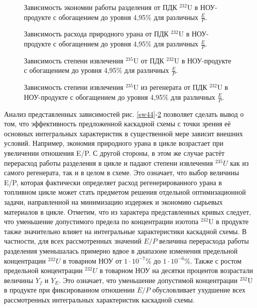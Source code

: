 \begin{figure}[ht]
    \centering
    \begin{minipage}{.5\textwidth}
      \centering
      
\caption{{Зависимость экономии работы разделения от ПДК $^{232}$U в НОУ-продукте с обогащением до уровня 4,95\% для различных $\frac{E}{P}$.{\label{sw495}}}}
    \end{minipage}%
    \begin{minipage}{.5\textwidth}
      \centering
      
    \caption{{Зависимость расхода природного урана от ПДК $^{232}$U в НОУ-продукте с обогащением до уровня 4,95\% для различных $\frac{E}{P}$.{\label{F0R495}}}}
\end{minipage}
\end{figure}


\begin{figure}[ht]
    \centering
    \begin{minipage}{.5\textwidth}
      \centering
      
      \caption{{Зависимость степени извлечения $^{235}$U от ПДК $^{232}$U в НОУ-продукте с обогащением до уровня 4,95\% для различных $\frac{E}{P}$.{\label{ex495}}}}
    \end{minipage}%
    \begin{minipage}{.5\textwidth}
      \centering
      
      \caption{{Зависимость степени извлечения $^{235}$U из регенерата от ПДК $^{232}$U в НОУ-продукте с обогащением до уровня 4,95\% для различных $\frac{E}{P}$.{\label{exR495}}}}
\end{minipage}
\end{figure}


Анализ представленных зависимостей рис. \ref{sw44}-\ref{exR495} позволяет сделать вывод о том, что эффективность предложенной каскадной схемы с точки зрения её основных интегральных характеристик в существенной мере зависит внешних условий. Например, экономия природного урана в цикле возрастает при увеличении отношения E/P. С другой стороны, в этом же случае растёт перерасход работы разделения в цикле и падают степени извлечения $^{235}U$ как из самого регенерата, так и в целом в схеме. Это означает, что выбор величины E/P, которая фактически определяет расход регенерированного урана в топливном цикле может стать предметом решения отдельной оптимизационной задачи, направленной на минимизацию издержек и экономию сырьевых материалов в цикле. 
Отметим, что из характера представленных кривых следует, что уменьшение допустимого предела по концентрации изотопа $^{232}$U в продукте также значительно влияет на интегральные характеристики каскадной схемы. В частности, для всех рассмотренных значений $E/P$ величина перерасхода работы разделения уменьшалась примерно вдвое в диапазоне изменения предельной концентрации $^{232}U$ в товарном НОУ от $1\cdot10^{-7}$\% до $1\cdot10^{-6}$\%. Также с ростом предельной концентрации $^{232}U$ в товарном НОУ на десятки процентов возрастали величины $Y_f$ и $Y_{E}$. Это означает, что уменьшение допустимой концентрации $^{232}$U в продукте при фиксированном отношении $E/P$ обусловливает ухудшение всех рассмотренных интегральных характеристик каскадной схемы. 

